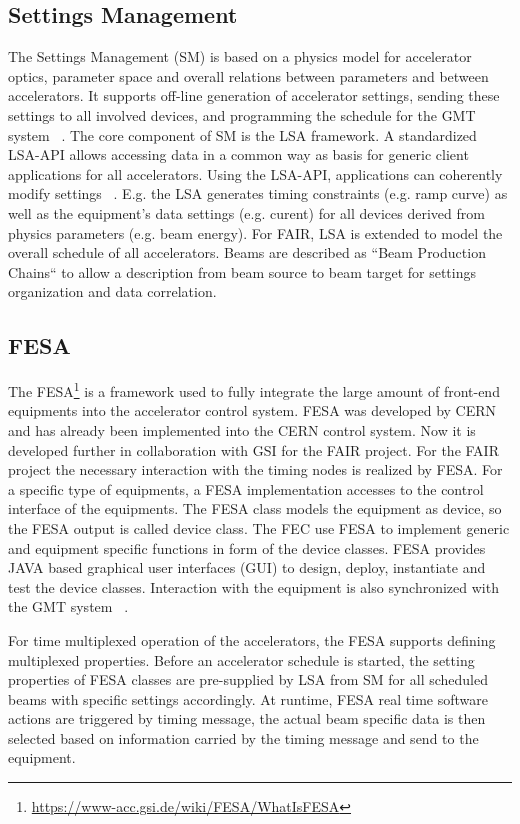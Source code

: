 \subsection{Settings Management}
The Settings Management (\gls{SM}) is based on a physics model for accelerator optics, parameter space and overall relations between parameters and between accelerators. It supports off-line generation of accelerator settings, sending these settings to all involved devices, and programming the schedule for the GMT system ~\cite{huhmann_fair_2013}. The core component of SM is the LSA framework. A standardized  LSA-\gls{API} allows accessing data in a common way as basis for generic client applications for all accelerators. Using the LSA-API, applications can coherently modify settings ~\cite{huhmann_fair_2013}. E.g. the LSA generates timing constraints (e.g. ramp curve) as well as the equipment's data settings (e.g. curent) for all devices derived from physics parameters (e.g. beam energy). For FAIR, LSA is extended to model the overall schedule of all accelerators. Beams are described as ``Beam Production Chains`` to allow a description from beam source to beam target for settings organization and data correlation.


\subsection{FESA}
The \gls{FESA}\footnote{\url{https://www-acc.gsi.de/wiki/FESA/WhatIsFESA}} is a framework used to fully integrate the large amount of front-end equipments into the accelerator control system. FESA was developed by CERN and has already been implemented into the \gls{CERN} control system. Now it is developed further in collaboration with GSI for the FAIR project. For the FAIR project the necessary interaction with the timing nodes is realized by FESA. For a specific type of equipments, a FESA implementation accesses to the control interface of the equipments. The FESA class models the equipment as device, so the FESA output is called device class. The \gls{FEC} use FESA to implement generic and equipment specific functions in form of the device classes. FESA provides JAVA based graphical user interfaces (GUI) to design, deploy, instantiate and test the device classes. Interaction with the equipment is also synchronized with the GMT system ~\cite{hoffmann_fesafront-end_2008}. 

For time multiplexed operation of the accelerators, the FESA supports defining multiplexed properties. Before an accelerator schedule is started, the setting properties of FESA classes are pre-supplied by LSA from SM for all scheduled beams with specific settings accordingly. At runtime, FESA real time software actions are triggered by timing message, the actual beam specific data is then selected based on information carried by the timing message and send to the equipment. 

